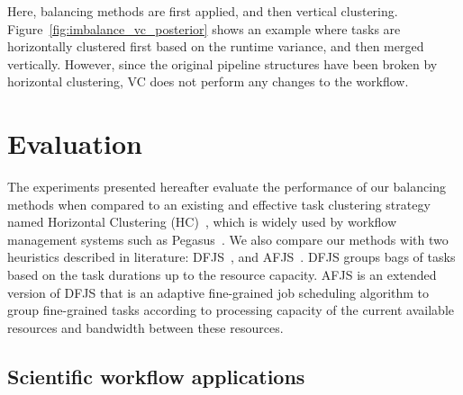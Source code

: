 \documentclass[final,5p,times,twocolumn]{elsarticle}
\begin{document}
Here, balancing methods are first applied, and then vertical clustering. Figure~\ref{fig:imbalance_vc_posterior} shows an example where tasks are horizontally clustered first based on the runtime variance, and then merged vertically. However, since the original pipeline structures have been broken by horizontal clustering, VC does not perform any changes to the workflow. 








\section{Evaluation}
\label{sec:experiments}

The experiments presented hereafter evaluate the performance of our balancing methods when compared to an existing and effective task clustering strategy named Horizontal Clustering (HC)~\cite{Singh:2008:WTC:1341811.1341822}, which is widely used by workflow management systems such as Pegasus~\cite{Deelman2004}. We also compare our methods with two heuristics described in literature: DFJS~\cite{Muthuvelu:2005:DJG:1082290.1082297}, and AFJS~\cite{Liu2009}. DFJS groups bags of tasks based on the task durations up to the resource capacity. AFJS is an extended version of DFJS that is an adaptive fine-grained job scheduling algorithm to group fine-grained tasks according to processing capacity of the current available resources and bandwidth between these resources.

\subsection{Scientific workflow applications}
\label{sec:applications}
\end{document}
